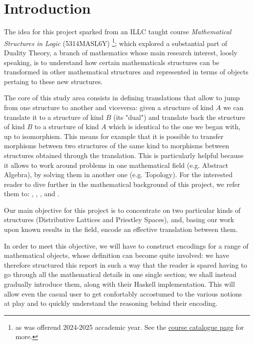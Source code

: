 \section{Introduction}

The idea for this project sparked from an ILLC taught course \textit{Mathematical Structures in Logic} (5314MASL6Y) \footnote{as was offerend 2024-2025 accademic year. See the \hyperlink{https://studiegids.uva.nl/xmlpages/page/2024-2025-en/search-course/course/118785}{course catalogue page} for more.}; which explored a substantial part of Duality Theory, a branch of mathematics whose main research interest, loosly speaking, is to understand how certain mathematicals structures can be  transformed in other mathematical structures and represented in terms of objects pertaing to these new structures. 

The core of this study area consists in defining translations that allow to jump from one structure to another and viceversa: given a structure of kind $A$ we can translate it to a structure of kind $B$ (its "dual") and translate back the structure of kind $B$ to a structure of kind $A$ which is identical to the one we began with, up to isomorphism. This means for example that it is possible to transfer morphisms between two structures of the same kind to morphisms between structures obtained through the translation. This is particularly helpful because it allows to work around problems in one mathematical field  (e.g. Abstract Algebra), by solving them in another one (e.g. Topology). For the interested reader to dive further in the mathematical background of this project, we refer them to: \cite{burrisCourseUniversalAlgebra2012}, \cite{daveyIntroductionLatticesOrder2010}, \cite{johnstoneStoneSpaces1992}, \cite{kelleyGeneralTopology2007} and \cite{munkresTopology2000}.

Our main objective for this project is to concentrate on two particular kinds of structures (Distributive Lattices and Priestley Spaces), and, basing our work upon known results in the field, encode an effective translation between them.

In order to meet this objective, we will have to construct encodings for a range of mathematical objects, whose definition can become quite involved: we have therefore structured this report in such a way that the reader is spared having to go through all the mathematical details in one single section; we shall instead gradually introduce them, along with their Haskell implementation. This will allow even the casual user to get confortably accostumed to the various notions at play and to quickly understand the reasoning behind their encoding.


